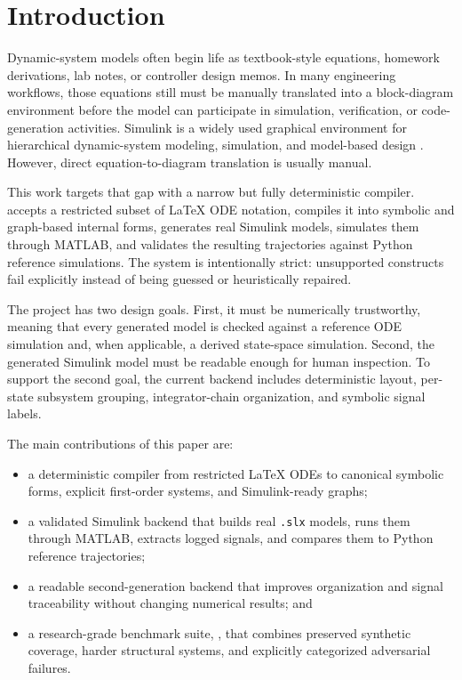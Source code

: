\documentclass[colorlinks,upint,subscriptcorrection,varvw,balance,nofoot]{asmeconf}
\newcommand{\EqnToSim}{\NoCaseChange{Eqn2Sim}}
\begin{document}
\section{Introduction}
Dynamic-system models often begin life as textbook-style equations, homework derivations, lab notes, or controller design memos. In many engineering workflows, those equations still must be manually translated into a block-diagram environment before the model can participate in simulation, verification, or code-generation activities. Simulink is a widely used graphical environment for hierarchical dynamic-system modeling, simulation, and model-based design \cite{mathworks2025simulink}. However, direct equation-to-diagram translation is usually manual.

This work targets that gap with a narrow but fully deterministic compiler. \EqnToSim{} accepts a restricted subset of \LaTeX{} ODE notation, compiles it into symbolic and graph-based internal forms, generates real Simulink models, simulates them through MATLAB, and validates the resulting trajectories against Python reference simulations. The system is intentionally strict: unsupported constructs fail explicitly instead of being guessed or heuristically repaired.

The project has two design goals. First, it must be numerically trustworthy, meaning that every generated model is checked against a reference ODE simulation and, when applicable, a derived state-space simulation. Second, the generated Simulink model must be readable enough for human inspection. To support the second goal, the current backend includes deterministic layout, per-state subsystem grouping, integrator-chain organization, and symbolic signal labels.

The main contributions of this paper are:
\begin{itemize}[leftmargin=*,nosep]
\item a deterministic compiler from restricted \LaTeX{} ODEs to canonical symbolic forms, explicit first-order systems, and Simulink-ready graphs;
\item a validated Simulink backend that builds real \texttt{.slx} models, runs them through MATLAB, extracts logged signals, and compares them to Python reference trajectories;
\item a readable second-generation backend that improves organization and signal traceability without changing numerical results; and
\item a research-grade benchmark suite, , that combines preserved synthetic coverage, harder structural systems, and explicitly categorized adversarial failures.
\end{itemize}
\end{document}
